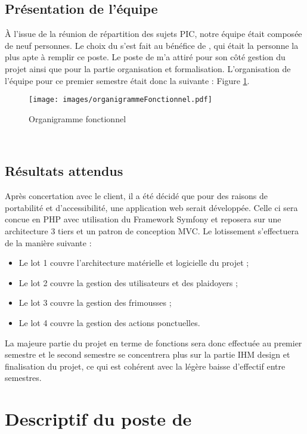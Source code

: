 \documentclass[asi]{picInsa}
\begin{document}
\section{Présentation de l'équipe}
À l’issue de la réunion de répartition des sujets PIC, notre équipe était composée de
neuf personnes. Le choix du \CP{} s’est fait au bénéfice de \Sergi{}, qui était la personne la plus apte à remplir ce poste.
Le poste de \RQ{} m'a attiré pour son côté gestion du projet ainsi que pour la partie organisation et formalisation.
L’organisation de l’équipe pour ce premier semestre était donc la suivante : Figure \ref{organigramme}.

\begin{figure}[H]
	\texttt{[image: images/organigrammeFonctionnel.pdf]}
	\caption{Organigramme fonctionnel}
	\label{organigramme}
\end{figure}
~\\


\section{Résultats attendus}
Après concertation avec le client, il a été décidé que pour des raisons de portabilité et d'accessibilité, une application web serait développée. Celle ci sera concue en PHP avec utilisation du Framework Symfony et reposera sur une architecture 3 tiers et un patron de conception MVC. Le lotissement s’effectuera de la manière suivante :
\begin{itemize}
\item Le lot 1 couvre l'architecture matérielle et logicielle du projet ;
\item Le lot 2 couvre la gestion des utilisateurs et des plaidoyers ;
\item Le lot 3 couvre la gestion des frimousses ;
\item Le lot 4 couvre la gestion des actions ponctuelles.
\end{itemize}

La majeure partie du projet en terme de fonctions sera donc effectuée au premier semestre et le second semestre se concentrera plus sur la partie IHM design et finalisation du projet, ce qui est cohérent avec la légère baisse d’effectif entre semestres.


\chapter{Descriptif du poste de \RQ}
\label{Descriptif}
\end{document}
